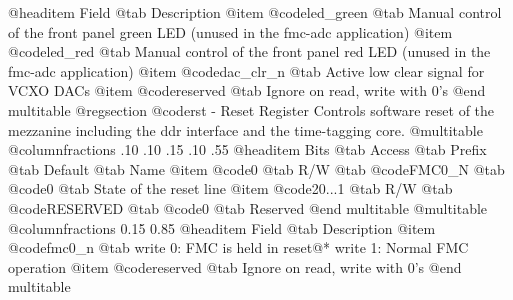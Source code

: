 @headitem Field @tab Description
@item @code{led_green} @tab Manual control of the front panel green LED (unused in the fmc-adc application)
@item @code{led_red} @tab Manual control of the front panel red LED (unused in the fmc-adc application)
@item @code{dac_clr_n} @tab Active low clear signal for VCXO DACs
@item @code{reserved} @tab Ignore on read, write with 0's
@end multitable
@regsection @code{rst} - Reset Register
Controls software reset of the mezzanine including the ddr interface and the time-tagging core.
@multitable @columnfractions .10 .10 .15 .10 .55
@headitem Bits @tab Access @tab Prefix @tab Default @tab Name
@item @code{0}
@tab R/W @tab
@code{FMC0_N}
@tab @code{0} @tab 
State of the reset line
@item @code{20...1}
@tab R/W @tab
@code{RESERVED}
@tab @code{0} @tab 
Reserved
@end multitable
@multitable @columnfractions 0.15 0.85
@headitem Field @tab Description
@item @code{fmc0_n} @tab write 0: FMC is held in reset@* write 1: Normal FMC operation
@item @code{reserved} @tab Ignore on read, write with 0's
@end multitable

